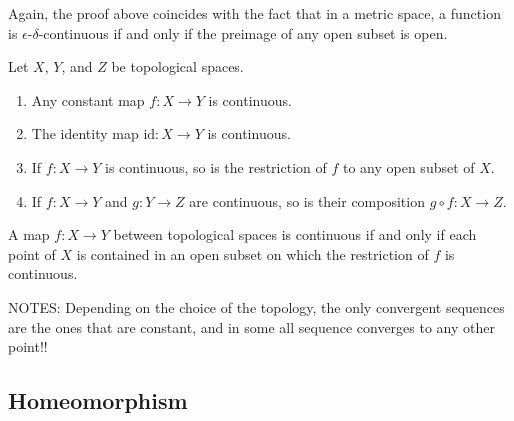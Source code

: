 \begin{rembox}
    \begin{remark}
        Again, the proof above coincides with the fact that in a metric space, a function is \(\epsilon\)-\(\delta\)-continuous if and only if the preimage of any open subset is open.
    \end{remark}
\end{rembox}

\begin{thmbox}
    \begin{lemma}
        Let \(X\), \(Y\), and \(Z\) be topological spaces.
        \begin{enumerate}
            \item Any constant map \(f: X \longrightarrow Y\) is continuous.
            \item The identity map \(\mathrm{id}: X \longrightarrow Y\) is continuous.
            \item If \(f: X \longrightarrow Y\) is continuous, so is the restriction of \(f\) to any open subset of \(X\).
            \item If \(f: X \longrightarrow Y\) and \(g: Y \longrightarrow Z\) are continuous, so is their composition \(g \circ f: X \longrightarrow Z\).
        \end{enumerate}
    \end{lemma}
\end{thmbox}

\begin{thmbox}
    \begin{lemma}
        A map \(f: X \longrightarrow Y\) between topological spaces is continuous if and only if each point of \(X\) is contained in an open subset on which the restriction of \(f\) is continuous.
    \end{lemma}
\end{thmbox}

NOTES:
Depending on the choice of the topology, the only convergent sequences are the ones that are constant, and in some all sequence converges to any other point!!



\newpage
\subsection*{Homeomorphism}

